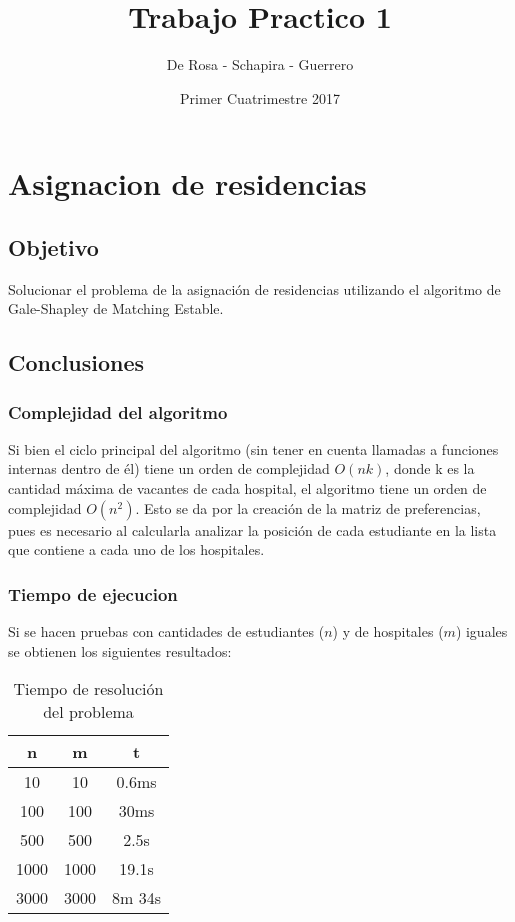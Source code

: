 \documentclass{article}
\title{Trabajo Practico 1}
\author{De Rosa - Schapira - Guerrero}
\date{Primer Cuatrimestre 2017}
\begin{document}
    \maketitle
    \newpage
    \tableofcontents
    \newpage

    \section{Asignacion de residencias}
        \subsection{Objetivo}
            Solucionar el problema de la asignación de residencias utilizando
            el algoritmo de Gale-Shapley de Matching Estable.
        \subsection{Conclusiones}
            \subsubsection{Complejidad del algoritmo}
                Si bien el ciclo principal del algoritmo (sin tener en cuenta
                llamadas a funciones internas dentro de él) tiene un orden de complejidad
                $O(nk)$, donde k es la cantidad máxima de vacantes de cada hospital,
                el algoritmo tiene un orden de complejidad $O(n^2)$. Esto se da por la
                creación de la matriz de preferencias, pues es necesario al calcularla analizar
                la posición de cada estudiante en la lista que contiene a cada uno de los hospitales.
            \subsubsection{Tiempo de ejecucion}
                Si se hacen pruebas con cantidades de estudiantes ($n$) y de hospitales
                ($m$) iguales se obtienen los siguientes resultados:
                \begin{table}[h!]
                    \centering
                    \caption{Tiempo de resolución del problema}
                    \begin{tabular}{c|c|c}
                        n & m & t \\
                        \hline
                        10 & 10 & 0.6ms \\
                        \hline
                        100 & 100 & 30ms \\
                        \hline
                        500 & 500 & 2.5s \\
                        \hline
                        1000 & 1000 & 19.1s \\
                        \hline
                        3000 & 3000 & 8m 34s
                    \end{tabular}
                \end{table}
\end{document}
